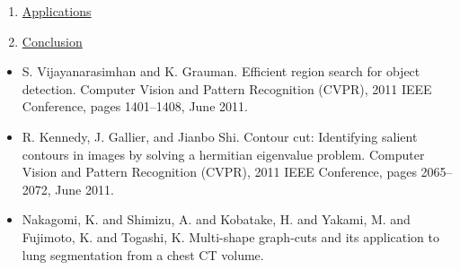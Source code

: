 \documentclass[11pt, a4paper, landscape]{article}
\begin{document}
\begin{enumerate}
\item \hyperlink{sli:application}{Applications}
\item \hyperlink{sli:conclusion}{Conclusion}
\end{enumerate}
\vfill


\NewPage{} 
\vfill 
\begin{itemize}
\item S. Vijayanarasimhan and K. Grauman. \alert{Efficient region search for object detection.} Computer Vision and Pattern Recognition (CVPR), 2011 IEEE Conference, pages 1401--1408, June 2011.
\item R. Kennedy, J. Gallier, and Jianbo Shi. \alert{Contour cut: Identifying salient contours in images
by solving a hermitian eigenvalue problem.} Computer Vision and Pattern Recognition (CVPR), 2011 IEEE Conference, pages 2065--2072, June 2011.
\item Nakagomi, K. and Shimizu, A. and Kobatake, H. and Yakami, M. and Fujimoto, K. and Togashi, K. \alert{Multi-shape graph-cuts and its application to lung segmentation from a chest CT volume.}
\end{itemize}
\vfill


\NewPage


\end{document}
